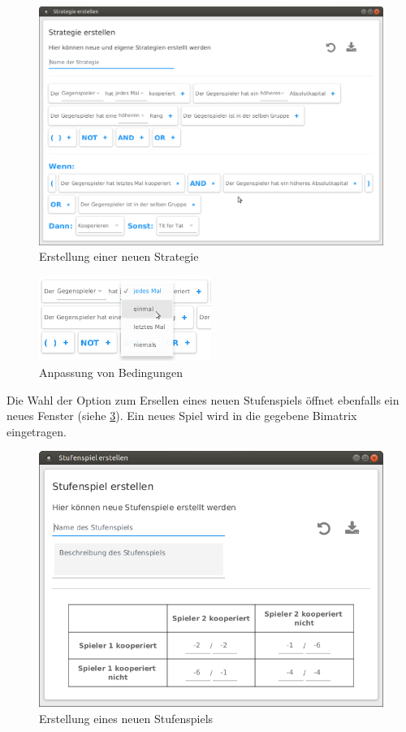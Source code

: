 \documentclass[parskip=full,11pt]{scrartcl}
\begin{document}
\begin{figure}[hb]
	\centering
	\includegraphics[width=\textwidth]{images/strategy.png}
	\caption{\label{fig:strategy}
		Erstellung einer neuen \Gls{Strategie}}
\end{figure}


\begin{figure}[hb]
	\centering
	\includegraphics[width=0.5\textwidth]{images/strategy_drop.png}
	\caption{\label{fig:strategy_drop}
		Anpassung von Bedingungen}
\end{figure}

Die Wahl der Option zum Ersellen eines neuen \Gls{Stufenspiel}s öffnet ebenfalls ein neues Fenster (siehe \cref{fig:new_game}). Ein neues Spiel wird in die gegebene \Gls{Bimatrix} eingetragen.

\begin{figure}[ht]
	\centering
	\includegraphics[width=\textwidth]{images/game.png}
	\caption{\label{fig:new_game}
		Erstellung eines neuen \Gls{Stufenspiel}s}
\end{figure}
\end{document}
